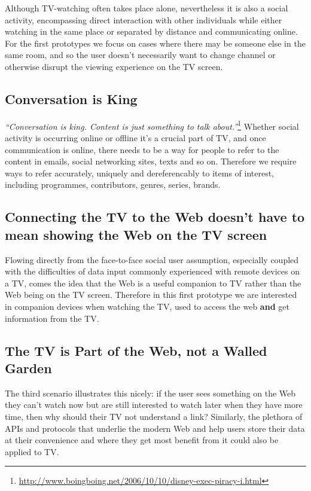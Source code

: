 \documentclass[]{article}%
\begin{document}
Although TV-watching often takes place alone, nevertheless it is also a social activity, encompassing direct interaction with other individuals while either watching in the same place or separated by distance and communicating online. For the first prototypes we focus on cases where there may be someone else in the same room, and so the user doesn't necessarily want to change channel or otherwise disrupt the viewing experience on the TV screen.

\subsection{Conversation is King}

\emph{``Conversation is king. Content is just something to talk about.''}\footnote{\url{http://www.boingboing.net/2006/10/10/disney-exec-piracy-i.html}} Whether social activity is occurring online or offline it's a crucial part of TV, and once communication is online, there needs to be a way for people to refer to the content in emails, social networking sites, texts and so on. Therefore we require ways to refer accurately, uniquely and dereferencably to items of interest, including programmes, contributors, genres, series, brands.

\subsection{Connecting the TV to the Web doesn't have to mean showing the Web on the TV screen}

Flowing directly from the face-to-face social user assumption, especially coupled with the difficulties of data input commonly experienced with remote devices on a TV, comes the idea that the Web is a useful companion to TV rather than the Web being on the TV screen. Therefore in this first prototype we are interested in companion devices when watching the TV, used to access the web {\bf and} get information from the TV.

\subsection{The TV is Part of the Web, not a Walled Garden}

The third scenario illustrates this nicely: if the user sees something on the Web they can't watch now but are still interested to watch later when they have more time, then why should their TV not understand a link? Similarly, the plethora of APIs and protocols that underlie the modern Web and help users store their data at their convenience and where they get most benefit from it could also be applied to TV.
\end{document}
